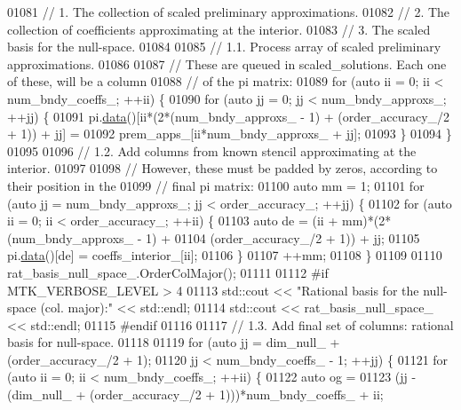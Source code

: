 \begin{DoxyCode}
{{01081   \textcolor{comment}{// 1. The collection of scaled preliminary approximations.}
01082   \textcolor{comment}{// 2. The collection of coefficients approximating at the interior.}
01083   \textcolor{comment}{// 3. The scaled basis for the null-space.}
01084 
01085   \textcolor{comment}{// 1.1. Process array of scaled preliminary approximations.}
01086 
01087   \textcolor{comment}{// These are queued in scaled\_solutions. Each one of these, will be a column}
01088   \textcolor{comment}{// of the pi matrix:}
01089   \textcolor{keywordflow}{for} (\textcolor{keyword}{auto} ii = 0; ii < num\_bndy\_coeffs\_; ++ii) \{
01090     \textcolor{keywordflow}{for} (\textcolor{keyword}{auto} jj = 0; jj < num\_bndy\_approxs\_; ++jj) \{
01091       pi.\hyperlink{classmtk_1_1DenseMatrix_a0c33b8a9e01d157c61ddbdf807c25d84}{data}()[ii*(2*(num\_bndy\_approxs\_ - 1) + (order\_accuracy\_/2 + 1)) + jj] =
01092         prem\_apps\_[ii*num\_bndy\_approxs\_ + jj];
01093     \}
01094   \}
01095 
01096   \textcolor{comment}{// 1.2. Add columns from known stencil approximating at the interior.}
01097 
01098   \textcolor{comment}{// However, these must be padded by zeros, according to their position in the}
01099   \textcolor{comment}{// final pi matrix:}
01100   \textcolor{keyword}{auto} mm = 1;
01101   \textcolor{keywordflow}{for} (\textcolor{keyword}{auto} jj = num\_bndy\_approxs\_; jj < order\_accuracy\_; ++jj) \{
01102     \textcolor{keywordflow}{for} (\textcolor{keyword}{auto} ii = 0; ii < order\_accuracy\_; ++ii) \{
01103       \textcolor{keyword}{auto} de = (ii + mm)*(2*(num\_bndy\_approxs\_ - 1) +
01104         (order\_accuracy\_/2 + 1)) + jj;
01105       pi.\hyperlink{classmtk_1_1DenseMatrix_a0c33b8a9e01d157c61ddbdf807c25d84}{data}()[de] = coeffs\_interior\_[ii];
01106     \}
01107     ++mm;
01108   \}
01109 
01110   rat\_basis\_null\_space\_.OrderColMajor();
01111 
01112 \textcolor{preprocessor}{  #if MTK\_VERBOSE\_LEVEL > 4}
01113   std::cout << \textcolor{stringliteral}{"Rational basis for the null-space (col. major):"} << std::endl;
01114   std::cout << rat\_basis\_null\_space\_ << std::endl;
01115 \textcolor{preprocessor}{  #endif}
01116 
01117   \textcolor{comment}{// 1.3. Add final set of columns: rational basis for null-space.}
01118 
01119   \textcolor{keywordflow}{for} (\textcolor{keyword}{auto} jj = dim\_null\_ + (order\_accuracy\_/2 + 1);
01120        jj < num\_bndy\_coeffs\_ - 1; ++jj) \{
01121     \textcolor{keywordflow}{for} (\textcolor{keyword}{auto} ii = 0; ii < num\_bndy\_coeffs\_; ++ii) \{
01122       \textcolor{keyword}{auto} og =
01123         (jj - (dim\_null\_ + (order\_accuracy\_/2 + 1)))*num\_bndy\_coeffs\_ + ii;
}}
\end{DoxyCode}
